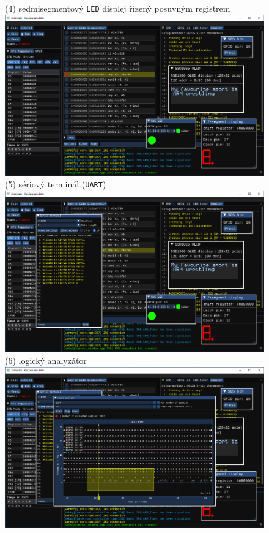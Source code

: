\documentclass[compress]{beamer}
\begin{document}
\begin{frame}
\begin{overlayarea}{\textwidth}{\textheight}
\begin{figure}
{			}%
			\only<4>
			{%
				\normalsize \textcolor{UBCblue}{(4) sedmisegmentový \texttt{LED} displej řízený posuvným registrem}\\
				\vspace{0.1cm}
				\includegraphics[width=.85\textwidth]{img/screenshot-05.pdf}%
			}%
			\only<5>
			{%
				\normalsize \textcolor{UBCblue}{(5) sériový terminál (\texttt{UART})}\\
				\vspace{0.1cm}
				\includegraphics[width=.85\textwidth]{img/screenshot-06.pdf}%
			}%
			\only<6>
			{%
				\normalsize \textcolor{UBCblue}{(6) logický analyzátor}\\
				\vspace{0.1cm}
				\includegraphics[width=.85\textwidth]{img/screenshot-07.pdf}%
			}%
		\end{figure}
	\end{overlayarea}
\end{frame}
\end{document}
